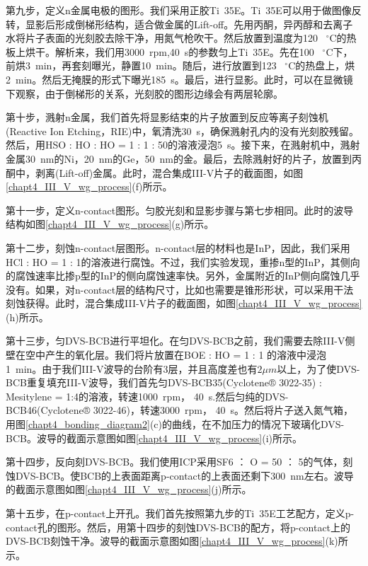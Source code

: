 第九步，定义n金属电极的图形。我们采用正胶Ti~35E。Ti~35E可以用于做图像反转，显影后形成倒梯形结构，适合做金属的Lift-off。先用丙酮，异丙醇和去离子水将片子表面的光刻胶去除干净，用氮气枪吹干。然后放置到温度为120 ~$^{\circ}$C的热板上烘干。解析来，我们用3000~rpm,40~s的参数匀上Ti~35E。先在100 ~$^{\circ}$C下，前烘3~min，再套刻曝光，静置10~min。随后，进行放置到123 ~$^{\circ}$C的热盘上，烘2~min。然后无掩膜的形式下曝光185~s。最后，进行显影。此时，可以在显微镜下观察，由于倒梯形的关系，光刻胶的图形边缘会有两层轮廓。

第十步，溅射n金属，我们首先将显影结束的片子放置到反应等离子刻蚀机(Reactive Ion Etching，RIE)中，氧清洗30~s，确保溅射孔内的没有光刻胶残留。然后，用HSO : HO : HO = 1 : 1 : 50的溶液浸泡5~s。接下来，在溅射机中，溅射金属30~nm的Ni，20~nm的Ge，50~nm的金。最后，去除溅射好的片子，放置到丙酮中，剥离(Lift-off)金属。此时，混合集成III-V片子的截面图，如图\ref{chapt4_III_V_wg_process}(f)所示。

第十一步，定义n-contact图形。匀胶光刻和显影步骤与第七步相同。此时的波导结构如图\ref{chapt4_III_V_wg_process}(g)所示。

第十二步，刻蚀n-contact层图形。n-contact层的材料也是InP，因此，我们采用HCl : HO = 1 : 1的溶液进行腐蚀。不过，我们实验发现，重掺n型的InP，其侧向的腐蚀速率比掺p型的InP的侧向腐蚀速率快。另外，金属附近的InP侧向腐蚀几乎没有。如果，对n-contact层的结构尺寸，比如也需要是锥形形状，可以采用干法刻蚀获得。此时，混合集成III-V片子的截面图，如图\ref{chapt4_III_V_wg_process}(h)所示。

第十三步，匀DVS-BCB进行平坦化。在匀DVS-BCB之前，我们需要去除III-V侧壁在空中产生的氧化层。我们将片放置在BOE : HO = 1 : 1 的溶液中浸泡1~min。由于我们III-V波导的台阶有3层，并且高度差也有$2 \mu m$以上，为了使DVS-BCB重复填充III-V波导，我们首先匀DVS-BCB35(Cyclotene® 3022-35)\cite{dvsbcb35} : Mesitylene = 1:4的溶液，转速1000~rpm， 40~s.然后匀纯的DVS-BCB46(Cyclotene® 3022-46)\cite{dvsbcb46}，转速3000~rpm， 40~s。然后将片子送入氮气箱，用图\ref{chapt4_bonding_diagram2}(c)的曲线，在不加压力的情况下玻璃化DVS-BCB。波导的截面示意图如图\ref{chapt4_III_V_wg_process}(i)所示。

第十四步，反向刻DVS-BCB。我们使用ICP采用SF6 ： O = 50 ： 5的气体，刻蚀DVS-BCB。使BCB的上表面距离p-contact的上表面还剩下300~nm左右。波导的截面示意图如图\ref{chapt4_III_V_wg_process}(j)所示。

第十五步，在p-contact上开孔。我们首先按照第九步的Ti~35E工艺配方，定义p-contact孔的图形。然后，用第十四步的刻蚀DVS-BCB的配方，将p-contact上的DVS-BCB刻蚀干净。波导的截面示意图如图\ref{chapt4_III_V_wg_process}(k)所示。

